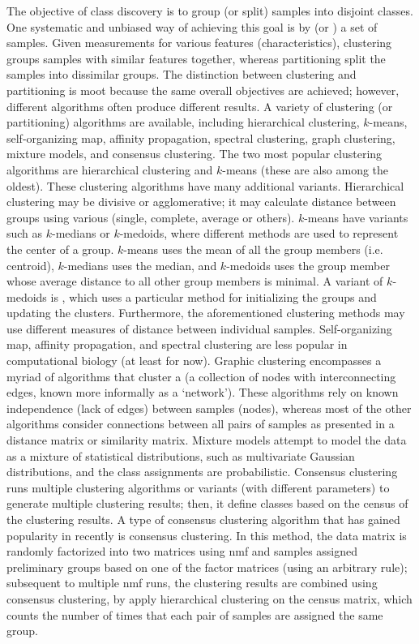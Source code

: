 The objective of class discovery is to group (or split) samples into disjoint classes. One systematic and unbiased way of achieving this goal is by  (or ) a set of samples. Given measurements for various features (characteristics), clustering groups samples with similar features together, whereas partitioning split the samples into dissimilar groups. The distinction between clustering and partitioning is moot because the same overall objectives are achieved; however, different algorithms often produce different results.  A variety of clustering (or partitioning) algorithms are available, including hierarchical clustering, $k$-means, self-organizing map, affinity propagation, spectral clustering, graph clustering, mixture models, and consensus clustering. The two most popular clustering algorithms are hierarchical clustering and $k$-means (these are also among the oldest). These clustering algorithms have many additional variants. Hierarchical clustering may be divisive or agglomerative; it may calculate distance between groups using various  (single, complete, average or others). $k$-means have variants such as $k$-medians or $k$-medoids, where different methods are used to represent the center of a group. $k$-means uses the mean of all the group members (i.e. centroid), $k$-medians uses the median, and $k$-medoids uses the group member whose average distance to all other group members is minimal. A variant of $k$-medoids is , which uses a particular method for initializing the groups and updating the clusters. Furthermore, the aforementioned clustering methods may use different measures of distance between individual samples. Self-organizing map, affinity propagation, and spectral clustering are less popular in computational biology (at least for now). Graphic clustering encompasses a myriad of algorithms that cluster a  (a collection of nodes with interconnecting edges, known more informally as a `network'). These algorithms rely on known independence (lack of edges) between samples (nodes), whereas most of the other algorithms consider connections between all pairs of samples as presented in a distance matrix or similarity matrix. Mixture models attempt to model the data as a mixture of statistical distributions, such as multivariate Gaussian distributions, and the class assignments are probabilistic. Consensus clustering runs multiple clustering algorithms or variants (with different parameters) to generate multiple clustering results; then, it define classes based on the census of the clustering results. A type of consensus clustering algorithm that has gained popularity in recently is  consensus clustering. In this method, the data matrix is randomly factorized into two matrices using \gls{nmf} and samples assigned preliminary groups based on one of the factor matrices (using an arbitrary rule); subsequent to multiple \gls{nmf} runs, the clustering results are combined using consensus clustering, by apply hierarchical clustering on the census matrix, which counts the number of times that each pair of samples are assigned the same group.

